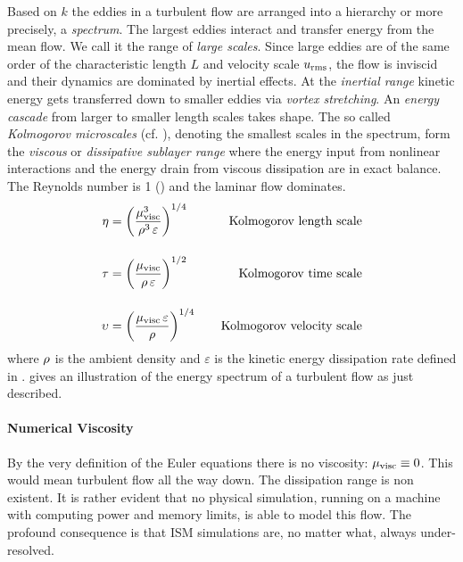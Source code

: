 Based on $k$ the eddies in a turbulent flow are arranged into a hierarchy or
more precisely, a \emph{spectrum}. The largest eddies interact and transfer
energy from the mean flow. We call it the range of \emph{large scales}. Since
large eddies are of the same order of the characteristic length $L$ and
velocity scale $u_{\text{rms}}$, the flow is inviscid and their dynamics are dominated by
inertial effects. At the \emph{inertial range} kinetic energy gets transferred
down to smaller eddies via \emph{vortex stretching}. An \emph{energy cascade}
from larger to smaller length scales takes shape. The so called
\emph{Kolmogorov microscales} (cf. \cite{kolmogorov1991dissipation}), denoting the smallest scales in the spectrum,
form the \emph{viscous} or \emph{dissipative sublayer range} where the energy
input from nonlinear interactions and the energy drain from viscous dissipation
are in exact balance. The Reynolds number is 1 () and the
laminar flow dominates.
\begin{align}
\label{eqn:kolmogorov-scales}
    \eta     &= \left(\frac{\mu_{\text{visc}}^3}{\rho^3\,\varepsilon}\right)^{1/4} \;\;\;\; &\text{Kolmogorov length scale} \\[0.4cm]
    \tau     &= \left(\frac{\mu_{\text{visc}}}{\rho\,\varepsilon}\right)^{1/2} \;\;\;\; &\text{Kolmogorov time scale} \\[0.4cm]
    \upsilon &= \left(\frac{\mu_{\text{visc}}\,\varepsilon}{\rho}\right)^{1/4} \;\;\;\; &\text{Kolmogorov velocity scale}
\end{align}
where $\rho$ is the ambient density and $\varepsilon$ is the
kinetic energy dissipation rate defined in .
 gives an illustration of the energy
spectrum of a turbulent flow as just described.

\paragraph{Numerical Viscosity} By the very definition of the Euler equations
there is no viscosity: $\mu_{\text{visc}} \equiv 0$. This would mean turbulent flow all the
way down. The dissipation range is non existent. It is rather evident that no
physical simulation, running on a machine with computing power and memory
limits, is able to model this flow. The profound consequence is that ISM
simulations are, no matter what, always under-resolved.

